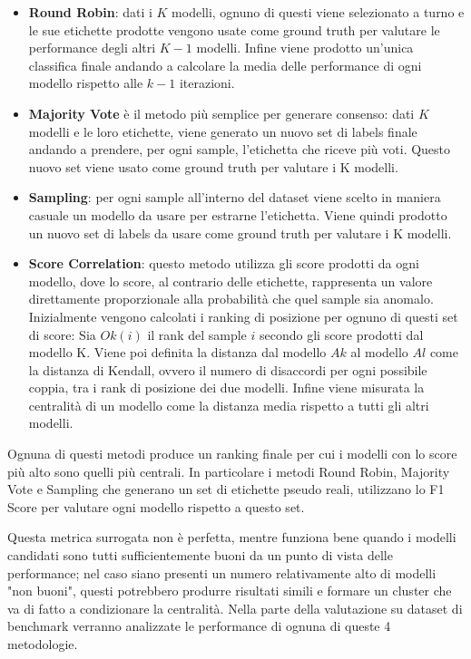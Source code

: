 \begin{itemize}
	\item \textbf{Round Robin}: dati i $K$ modelli, ognuno di questi viene selezionato a turno e le sue etichette prodotte vengono usate come ground truth per valutare le performance degli altri $K-1$ modelli. Infine viene prodotto un'unica classifica finale andando a calcolare la media delle performance di ogni modello rispetto alle $k-1$ iterazioni. 
	\item \textbf{Majority Vote} è il metodo più semplice per generare consenso: dati $K$ modelli e le loro etichette, viene generato un nuovo set di labels finale andando a prendere, per ogni sample, l'etichetta che riceve più voti. Questo nuovo set viene usato come ground truth per valutare i K modelli.
	\item \textbf{Sampling}: per ogni sample all'interno del dataset viene scelto in maniera casuale un modello da usare per estrarne l'etichetta. Viene quindi prodotto un nuovo set di labels da usare come ground truth per valutare i K modelli.
	\item \textbf{Score Correlation}: questo metodo utilizza gli score prodotti da ogni modello, dove lo score, al contrario delle etichette, rappresenta un valore direttamente proporzionale alla probabilità che quel sample sia anomalo. Inizialmente vengono calcolati i ranking di posizione per ognuno di questi set di score: Sia $Ok(i)$ il rank del sample $i$ secondo gli score prodotti dal modello K. Viene poi definita la distanza dal modello $Ak$ al modello $Al$ come la distanza di Kendall, ovvero il numero di disaccordi per ogni possibile coppia, tra i rank di posizione dei due modelli. Infine viene misurata la centralità di un modello come la distanza media rispetto a tutti gli altri modelli.
\end{itemize}

Ognuna di questi metodi produce un ranking finale per cui i modelli con lo score più alto sono quelli più centrali. In particolare i metodi Round Robin, Majority Vote e Sampling che generano un set di etichette pseudo reali, utilizzano lo F1 Score per valutare ogni modello rispetto a questo set.

Questa metrica surrogata non è perfetta, mentre funziona bene quando i modelli candidati sono tutti sufficientemente buoni da un punto di vista delle performance; nel caso siano presenti un numero relativamente alto di modelli "non buoni", questi potrebbero produrre risultati simili e formare un cluster che va di fatto a condizionare la centralità.
Nella parte della valutazione su dataset di benchmark verranno analizzate le performance di ognuna di queste 4 metodologie.


